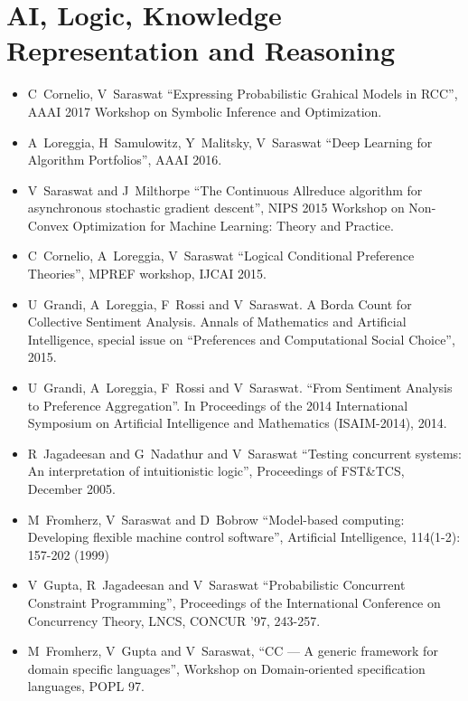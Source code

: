 \documentclass{article}
\begin{document}
\section*{AI, Logic, Knowledge Representation and Reasoning}
\begin{itemize}
\item C~Cornelio, V~Saraswat ``Expressing Probabilistic Grahical
  Models in RCC'', AAAI 2017 Workshop on Symbolic Inference and
  Optimization. 

\item  A~Loreggia, H~Samulowitz, Y~Malitsky, V~Saraswat ``Deep
Learning for Algorithm Portfolios'', AAAI 2016.  

\item V~Saraswat and J~Milthorpe ``The Continuous Allreduce algorithm
  for asynchronous stochastic gradient descent'', NIPS 2015  Workshop
  on Non-Convex Optimization for Machine Learning: Theory and Practice.

\item C~Cornelio, A~Loreggia, V~Saraswat ``Logical
Conditional Preference Theories'', MPREF workshop, IJCAI 2015. 

\item U~Grandi, A~Loreggia, F~Rossi and V~Saraswat. A
Borda Count for Collective Sentiment Analysis. Annals of Mathematics
and Artificial Intelligence, special issue on ``Preferences and
Computational Social Choice'', 2015. 

\item U~Grandi, A~Loreggia, F~Rossi and V~Saraswat. ``From Sentiment
  Analysis to Preference Aggregation''. In Proceedings of the 2014
  International Symposium on Artificial Intelligence and Mathematics
  (ISAIM-2014), 2014.   

\item R~Jagadeesan and G~Nadathur and V~Saraswat
``Testing concurrent systems: An interpretation of intuitionistic
logic'', Proceedings of FST\&TCS, December 2005.

\item  M~Fromherz, V~Saraswat and D~Bobrow
  ``Model-based computing: Developing flexible machine control
  software'', Artificial Intelligence, 114(1-2): 157-202 (1999)

\item  V~Gupta, R~Jagadeesan and V~Saraswat ``Probabilistic
  Concurrent Constraint Programming'', Proceedings of the
  International Conference on Concurrency Theory, LNCS, CONCUR '97,
  243-257.

\item  M~Fromherz, V~Gupta and V~Saraswat, ``CC
     --- A  generic framework for domain specific languages'',
    Workshop  on Domain-oriented specification languages, POPL 97.


\end{itemize}
\end{document}
